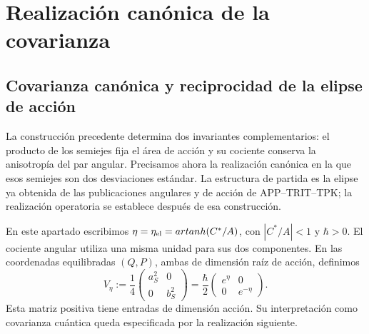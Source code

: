 \chapter{Realización canónica de la covarianza}
\label{x_reciprocidad:nuclear:covarianza-antecedente}


\section{Covarianza canónica y reciprocidad de la elipse de acción}
\label{x_reciprocidad:sec:ii-area-covarianza}

La construcción precedente determina dos invariantes complementarios:
el producto de los semiejes fija el área de acción y su cociente conserva
la anisotropía del par angular. Precisamos ahora la realización canónica
en la que esos semiejes son dos desviaciones estándar. La estructura de
partida es la elipse ya obtenida de las publicaciones angulares y de
acción de APP--TRIT--TPK; la realización operatoria se establece después
de esa construcción.

En este apartado escribimos \(\eta=\eta_{\rm el}
=\operatorname{artanh}(C^*/A)\), con \(|C^*/A|<1\) y
\(\hbar>0\). El cociente angular utiliza una misma unidad para sus dos
componentes. En las coordenadas equilibradas \((Q,P)\), ambas de
dimensión raíz de acción, definimos
\begin{equation}
 V_\eta:=\frac14
 \begin{pmatrix}a_S^2&0\\0&b_S^2\end{pmatrix}
 =\frac{\hbar}{2}
 \begin{pmatrix}e^\eta&0\\0&e^{-\eta}\end{pmatrix}.
 \label{x_reciprocidad:eq:ii-covarianza-geometrica}
\end{equation}
Esta matriz positiva tiene entradas de dimensión acción. Su interpretación
como covarianza cuántica queda especificada por la realización siguiente.


